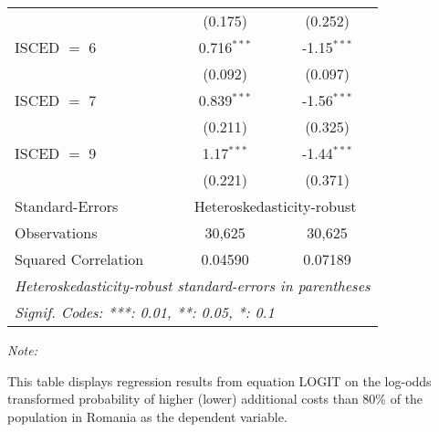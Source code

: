 \begin{table}[htbp!]
\begin{adjustbox}{width = 1\textwidth, max height = 0.95\textheight, center}
\begin{threeparttable}[b]
\begin{tabular}{lcc}
                                 & (0.175)        & (0.252)\\   
            ISCED $=$ 6          & 0.716$^{***}$  & -1.15$^{***}$\\   
                                 & (0.092)        & (0.097)\\   
            ISCED $=$ 7          & 0.839$^{***}$  & -1.56$^{***}$\\   
                                 & (0.211)        & (0.325)\\   
            ISCED $=$ 9          & 1.17$^{***}$   & -1.44$^{***}$\\   
                                 & (0.221)        & (0.371)\\   
            \midrule 
            Standard-Errors & \multicolumn{2}{c}{Heteroskedasticity-robust} \\ 
            Observations         & 30,625         & 30,625\\  
            Squared Correlation  & 0.04590        & 0.07189\\  
            \midrule \midrule
            \multicolumn{3}{l}{\emph{Heteroskedasticity-robust standard-errors in parentheses}}\\
            \multicolumn{3}{l}{\emph{Signif. Codes: ***: 0.01, **: 0.05, *: 0.1}}\\
         \end{tabular}
         
         \begin{tablenotes}\item \medskip \textit{Note:}
            \item This table displays regression results from equation LOGIT on the log-odds transformed probability of higher (lower) additional costs than 80\% of the population in Romania as the dependent variable. 
         \end{tablenotes}
      \end{threeparttable}
   \end{adjustbox}
\end{table}



